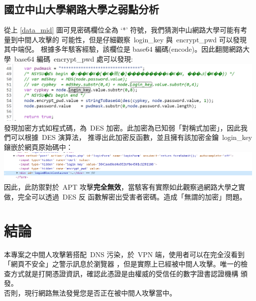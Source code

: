 \documentclass[a4paper]{article}
\begin{document}
\begin{CJK*}{UTF8}{bsmi}
    \subsection{國立中山大學網路大學之弱點分析}
    \label{cu}
    從上 \ref{data_mid} 圖可見密碼欄位全為 `*' 符號，我們猜測中山網路大學可能有考量到中間人攻擊的
    可能性，但是仔細觀察\ login\_key 與\ encrypt\_pwd 可以發現其中端倪。
    根據多年駭客經驗，該欄位是 base64 編碼(encode)。因此翻閱網路大學\ base64 編碼\ encrypt\_pwd
    處可以發現:\\
    \includegraphics[width=\textwidth]{images/image_2022-01-14_01-02-16.png}\\
    發現加密方式如程式碼，為\ DES 加密。此加密為已知弱「對稱式加密」，因此我們可以根據\ DES 演算法，
    推導出此加密反函數，並且擁有該加密金鑰\ login\_key 鑲嵌於網頁原始碼中：\\
    \includegraphics[width=\textwidth]{images/Screenshot_2022-01-14_01-11-36.png}\\

    因此，此防禦對於\ APT 攻擊\textbf{完全無效}，當駭客有實際如此觀察過網路大學之實做，完全可以透過\ DES 反
    函數解密出受害者密碼。造成「無謂的加密」問題。

    \section{結論}
    本專案之中間人攻擊箬搭配\ DNS 污染，於\ VPN 端，使用者可以在完全沒看到「網頁不安全」之警示訊息於瀏覽器
    ，但是實際上已經被中間人攻擊。唯一的檢查方式就是打開憑證資訊，確認此憑證是由權威的受信任的數字證書認證機構
    頒發。\\

    否則，現行網路無法發覺您是否正在被中間人攻擊當中。


\end{CJK*}
\end{document}
